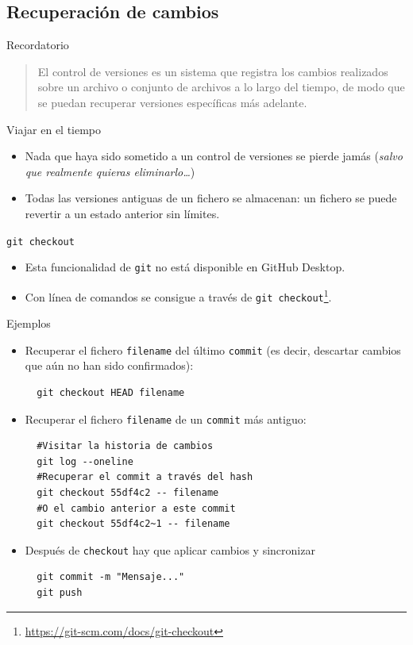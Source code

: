 \documentclass[aspectratio=169, xcolor={usenames,svgnames,dvipsnames}]{beamer}
\begin{document}
\subsection{Recuperación de cambios}
\label{sec:org4388aa7}
\begin{frame}[label={sec:org645874e}]{Recordatorio}
\begin{quote}
El control de versiones es un sistema que \alert{registra los cambios}
realizados sobre un archivo o conjunto de archivos a lo largo del
tiempo, de modo que se puedan \alert{recuperar} versiones específicas más
adelante.
\end{quote}
\begin{block}{Viajar en el tiempo}
\begin{itemize}
\item Nada que haya sido sometido a un control de versiones se pierde jamás (\emph{salvo que realmente quieras eliminarlo\ldots{}})
\item \alert{Todas} las versiones antiguas de un fichero se almacenan: un fichero se puede revertir a un estado anterior sin límites.
\end{itemize}
\end{block}
\end{frame}
\begin{frame}[label={sec:org13db9d3},fragile]{\texttt{git checkout}}
 \begin{itemize}
\item Esta funcionalidad de \texttt{git} no está disponible en GitHub Desktop.
\item Con línea de comandos se consigue a través de \texttt{git checkout}\footnote{\url{https://git-scm.com/docs/git-checkout}}.
\end{itemize}
\end{frame}
\begin{frame}[label={sec:org292c3c1},fragile]{Ejemplos}
 \begin{itemize}
\item Recuperar el fichero \texttt{filename} del último \texttt{commit} (es decir, descartar cambios que aún no han sido confirmados):
\lstset{language=sh,label= ,caption= ,captionpos=b,numbers=none}
\begin{lstlisting}
  git checkout HEAD filename
\end{lstlisting}

\item Recuperar el fichero \texttt{filename} de un \texttt{commit} más antiguo:
\lstset{language=sh,label= ,caption= ,captionpos=b,numbers=none}
\begin{lstlisting}
  #Visitar la historia de cambios
  git log --oneline
  #Recuperar el commit a través del hash
  git checkout 55df4c2 -- filename
  #O el cambio anterior a este commit
  git checkout 55df4c2~1 -- filename
\end{lstlisting}

\item Después de \texttt{checkout} hay que aplicar cambios y sincronizar
\lstset{language=sh,label= ,caption= ,captionpos=b,numbers=none}
\begin{lstlisting}
  git commit -m "Mensaje..."
  git push
\end{lstlisting}
\end{itemize}
\end{frame}
\end{document}

